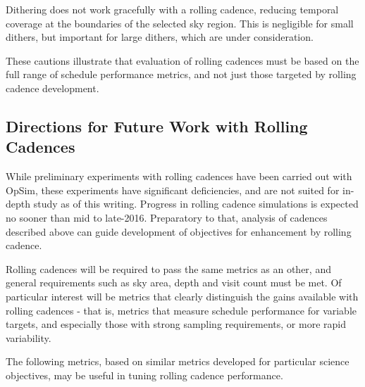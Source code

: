 Dithering does not work gracefully with a rolling cadence, reducing temporal coverage at the boundaries of the selected sky region.  This is negligible for small dithers, but important for large dithers, which are under consideration.

These cautions illustrate that evaluation of rolling cadences must be based on the full range of schedule performance metrics, and not just those targeted by rolling cadence development.

\subsection{Directions for Future Work with Rolling Cadences}
\label{sec:rolling:directions}

While preliminary experiments with rolling cadences have been carried out with OpSim, these experiments have significant deficiencies, and are not suited for in-depth study as of this writing.  Progress in rolling cadence simulations is expected no sooner than mid to late-2016. Preparatory to that, analysis of cadences described above can guide development of objectives for enhancement by rolling cadence.  

Rolling cadences will be required to pass the same metrics as an other, and general requirements such as sky area, depth and visit count must be met.  Of particular interest will be metrics that clearly distinguish the gains available with rolling cadences - that is, metrics that measure schedule performance for variable targets, and especially those with strong sampling requirements, or more rapid variability.

The following metrics, based on similar metrics developed for particular science objectives, may be useful in tuning rolling cadence performance. 

